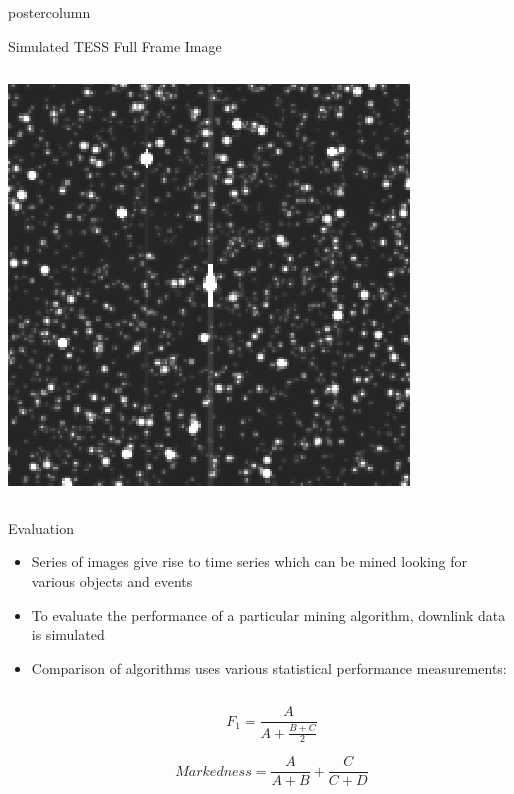 \documentclass[final,hyperref={pdfpagelabels=false}]{beamer}
\begin{document}
\begin{frame}
\begin{columns}
\begin{column}{.49\textwidth}
\begin{beamercolorbox}[center,wd=\textwidth]{postercolumn}
\begin{minipage}[T]{.95\textwidth}
{\begin{block}{Simulated TESS Full Frame Image}
\begin{columns}
\begin{column}{.38\textwidth}
                  \includegraphics[width=0.80\linewidth]{figures/ffi_simulation.jpg}
		\end{column}
	       \end{columns}
            \end{block}
            \vspace{1cm}
            \begin{block}{Evaluation}
            	\begin{itemize}
			\item Series of images give rise to time series which can be mined looking for various objects and events
			\item To evaluate the performance of a particular mining algorithm, downlink data is simulated 
			\item Comparison of algorithms uses various statistical performance measurements:
				\begin{columns}
                			\begin{column}{.60\textwidth}
			        $$ F_1 = \frac{A}{A + \frac{B + C}{2}} $$
			       
			       $$ Markedness = \frac{A}{A + B} + \frac{C}{C+D}$$
			       

\end{column}
\end{columns}
\end{itemize}
\end{block}}
\end{minipage}
\end{beamercolorbox}
\end{column}
\end{columns}
\end{frame}
\end{document}
